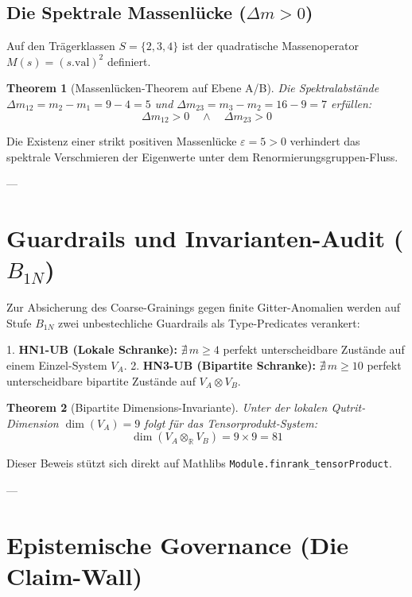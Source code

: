 \documentclass[11pt,a4paper]{article}
\newtheorem{theorem}{Theorem}[section]
\begin{document}
\subsection{Die Spektrale Massenlücke ($\Delta m > 0$)}

Auf den Trägerklassen $S = \{2, 3, 4\}$ ist der quadratische Massenoperator $M(s) = (s.\text{val})^2$ definiert.

\begin{theorem}[Massenlücken-Theorem auf Ebene A/B]
Die Spektralabstände $\Delta m_{12} = m_2 - m_1 = 9 - 4 = 5$ und $\Delta m_{23} = m_3 - m_2 = 16 - 9 = 7$ erfüllen:
\begin{equation}
\Delta m_{12} > 0 \quad \wedge \quad \Delta m_{23} > 0
\end{equation}
\end{theorem}

Die Existenz einer strikt positiven Massenlücke $\varepsilon = 5 > 0$ verhindert das spektrale Verschmieren der Eigenwerte unter dem Renormierungsgruppen-Fluss.

---

\section{Guardrails und Invarianten-Audit ($B_{1N}$)}

Zur Absicherung des Coarse-Grainings gegen finite Gitter-Anomalien werden auf Stufe $B_{1N}$ zwei unbestechliche Guardrails als Type-Predicates verankert:

1. \textbf{HN1-UB (Lokale Schranke):} $\nexists\, m \ge 4$ perfekt unterscheidbare Zustände auf einem Einzel-System $V_A$.
2. \textbf{HN3-UB (Bipartite Schranke):} $\nexists\, m \ge 10$ perfekt unterscheidbare bipartite Zustände auf $V_A \otimes V_B$.

\begin{theorem}[Bipartite Dimensions-Invariante]
Unter der lokalen Qutrit-Dimension $\dim(V_A) = 9$ folgt für das Tensorprodukt-System:
\begin{equation}
\dim(V_A \otimes_{\mathbb{R}} V_B) = 9 \times 9 = 81
\end{equation}
\end{theorem}

Dieser Beweis stützt sich direkt auf Mathlibs \texttt{Module.finrank\_tensorProduct}.

---

\section{Epistemische Governance (Die Claim-Wall)}
\end{document}

